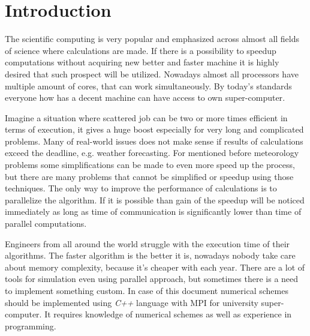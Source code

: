 \chapter{Introduction} \label{chp:introduction}
	The scientific computing is very popular and emphasized across almost all fields of science where calculations are made. If there is a possibility to speedup computations without acquiring new better and faster machine it is highly desired that such prospect will be utilized. Nowadays almost all processors have multiple amount of cores, that can work simultaneously. By today's standards everyone how has a decent machine can have access to own \gls{super-computer}.
	
	Imagine a situation where scattered job can be two or more times efficient in terms of execution, it gives a huge boost especially for very long and complicated problems. Many of real-world issues does not make sense if results of calculations exceed the deadline, e.g. weather forecasting. For mentioned before meteorology problems some simplifications can be made to even more speed up the process, but there are many problems that cannot be simplified or speedup using those techniques. The only way to improve the performance of calculations is to parallelize the algorithm. If it is possible than gain of the speedup will be noticed immediately as long as time of communication is significantly lower than time of parallel computations.	 
	
	Engineers from all around the world struggle with the execution time of their algorithms. The faster algorithm is the better it is, nowadays nobody take care about memory complexity, because it's cheaper with each year. There are a lot of tools for simulation even using parallel approach, but sometimes there is a need to implement something custom. In case of this document numerical schemes should be implemented using \emph{C++} language with \gls{MPI} for university \gls{super-computer}. It requires knowledge of numerical schemes as well as experience in programming.
	
